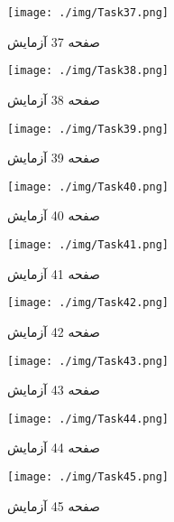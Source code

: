{ 
\begin{figure}[htpb]
\centering
\texttt{[image: ./img/Task37.png]}
\caption{ صفحه 37 آزمایش }
\label{fig:Task37}
\end{figure}
 
 
\begin{figure}[htpb]
\centering
\texttt{[image: ./img/Task38.png]}
\caption{ صفحه 38 آزمایش }
\label{fig:Task38}
\end{figure}
 
 
\begin{figure}[htpb]
\centering
\texttt{[image: ./img/Task39.png]}
\caption{ صفحه 39 آزمایش }
\label{fig:Task39}
\end{figure}
 
 
\begin{figure}[htpb]
\centering
\texttt{[image: ./img/Task40.png]}
\caption{ صفحه 40 آزمایش }
\label{fig:Task40}
\end{figure}
 
 
\begin{figure}[htpb]
\centering
\texttt{[image: ./img/Task41.png]}
\caption{ صفحه 41 آزمایش }
\label{fig:Task41}
\end{figure}
 
 
\begin{figure}[htpb]
\centering
\texttt{[image: ./img/Task42.png]}
\caption{ صفحه 42 آزمایش }
\label{fig:Task42}
\end{figure}
 
 
\begin{figure}[htpb]
\centering
\texttt{[image: ./img/Task43.png]}
\caption{ صفحه 43 آزمایش }
\label{fig:Task43}
\end{figure}
 
 
\begin{figure}[htpb]
\centering
\texttt{[image: ./img/Task44.png]}
\caption{ صفحه 44 آزمایش }
\label{fig:Task44}
\end{figure}
 
 
\begin{figure}[htpb]
\centering
\texttt{[image: ./img/Task45.png]}
\caption{ صفحه 45 آزمایش }
\label{fig:Task45}
\end{figure}
 
}
